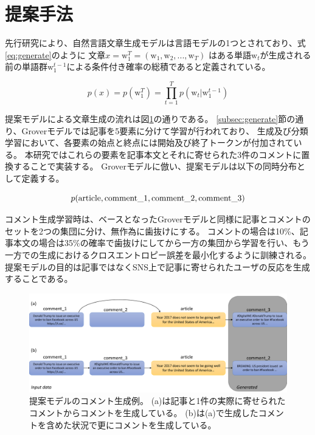 \section{提案手法}

先行研究により、自然言語文章生成モデルは言語モデルの1つとされており、式\ref{eq:generate}のように
文章$x = \mathrm{w}_1^T = (\mathrm{w}_1, \mathrm{w}_2, ..., \mathrm{w}_T)$
はある単語$\mathrm{w}_t$が生成される前の単語群$ \mathrm{w}_1^{t-1}$による条件付き確率の総積であると定義されている。

\begin{equation}
    \label{eq:generate}
    p(x) = p(\mathrm{w}_1^T) = \prod_{t=1}^{T} p(\mathrm{w}_t|\mathrm{w}_1^{t-1})
\end{equation}

提案モデルによる文章生成の流れは図\ref{fig:method}の通りである。
\ref{subsec:generate}節の通り、Groverモデルでは記事を5要素に分けて学習が行われており、
生成及び分類学習において、各要素の始点と終点には開始及び終了トークンが付加されている。
本研究ではこれらの要素を記事本文とそれに寄せられた3件のコメントに置換することで実装する。
Groverモデルに倣い、提案モデルは以下の同時分布として定義する。

\begin{equation}
    \label{eq:joint_distri}
    p(\rm{article}, \rm{comment\_1}, \rm{comment\_2}, \rm{comment\_3})
\end{equation}

コメント生成学習時は、ベースとなったGroverモデルと同様に記事とコメントのセットを2つの集団に分け、無作為に歯抜けにする。
コメントの場合は10\%、記事本文の場合は35\%の確率で歯抜けにしてから一方の集団から学習を行い、もう一方での生成におけるクロスエントロピー誤差を最小化するように訓練される\cite{NIPS2019_9106}。
提案モデルの目的は記事ではなくSNS上で記事に寄せられたユーザの反応を生成することである。

\begin{figure}[t]
    \centering
    \includegraphics[width=\linewidth,pagebox=cropbox,clip]{images/fig_method.pdf}
    \caption{
        提案モデルのコメント生成例。
        (a)は記事と1件の実際に寄せられたコメントからコメントを生成している。
        (b)は(a)で生成したコメントを含めた状況で更にコメントを生成している。
    }
    \label{fig:method}
\end{figure}

